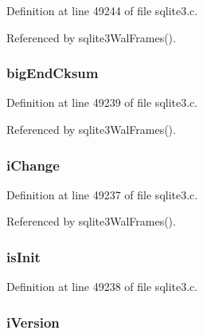 Definition at line 49244 of file sqlite3.\+c.



Referenced by sqlite3\+Wal\+Frames().

\hypertarget{struct_wal_index_hdr_ab1a5f50baf0ba086cabe461481d21b03}{}
\subsubsection[{big\+End\+Cksum}]{ big\+End\+Cksum}\label{struct_wal_index_hdr_ab1a5f50baf0ba086cabe461481d21b03}


Definition at line 49239 of file sqlite3.\+c.



Referenced by sqlite3\+Wal\+Frames().

\hypertarget{struct_wal_index_hdr_aa8471e66ae706687aabad217def07c91}{}
\subsubsection[{i\+Change}]{ i\+Change}\label{struct_wal_index_hdr_aa8471e66ae706687aabad217def07c91}


Definition at line 49237 of file sqlite3.\+c.



Referenced by sqlite3\+Wal\+Frames().

\hypertarget{struct_wal_index_hdr_a7318e02c1fe25199c0198f703c630337}{}
\subsubsection[{is\+Init}]{ is\+Init}\label{struct_wal_index_hdr_a7318e02c1fe25199c0198f703c630337}


Definition at line 49238 of file sqlite3.\+c.

\hypertarget{struct_wal_index_hdr_a95077ae3f44a9820e9304854bd6d832a}{}
\subsubsection[{i\+Version}]{ i\+Version}\label{struct_wal_index_hdr_a95077ae3f44a9820e9304854bd6d832a}


